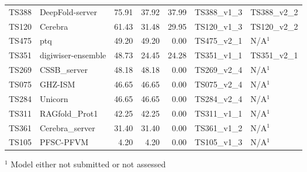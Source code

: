 \begin{table}[ht]
{\begin{tabular}{llrrrll}
TS388 & DeepFold-server & 75.91 & 37.92 & 37.99 & TS388\_v1\_3 & TS388\_v2\_2 \\ 
TS120 & Cerebra & 61.43 & 31.48 & 29.95 & TS120\_v1\_3 & TS120\_v2\_2 \\ 
TS475 & ptq & 49.20 & 49.20 & 0.00 & TS475\_v2\_1 & N/A$^{1}$ \\ 
TS351 & digiwiser-ensemble & 48.73 & 24.45 & 24.28 & TS351\_v1\_1 & TS351\_v2\_1 \\ 
TS269 & CSSB\_server & 48.18 & 48.18 & 0.00 & TS269\_v2\_4 & N/A$^{1}$ \\ 
TS075 & GHZ-ISM & 46.65 & 46.65 & 0.00 & TS075\_v2\_4 & N/A$^{1}$ \\ 
TS284 & Unicorn & 46.65 & 46.65 & 0.00 & TS284\_v2\_4 & N/A$^{1}$ \\ 
TS311 & RAGfold\_Prot1 & 42.25 & 42.25 & 0.00 & TS311\_v1\_1 & N/A$^{1}$ \\ 
TS361 & Cerebra\_server & 31.40 & 31.40 & 0.00 & TS361\_v1\_2 & N/A$^{1}$ \\ 
TS105 & PFSC-PFVM & 4.20 & 4.20 & 0.00 & TS105\_v1\_3 & N/A$^{1}$ \\ 
\bottomrule
\end{tabular}%
}
\begin{flushleft}\footnotesize $^{1}$ Model either not submitted or not assessed\end{flushleft}
\end{table}
